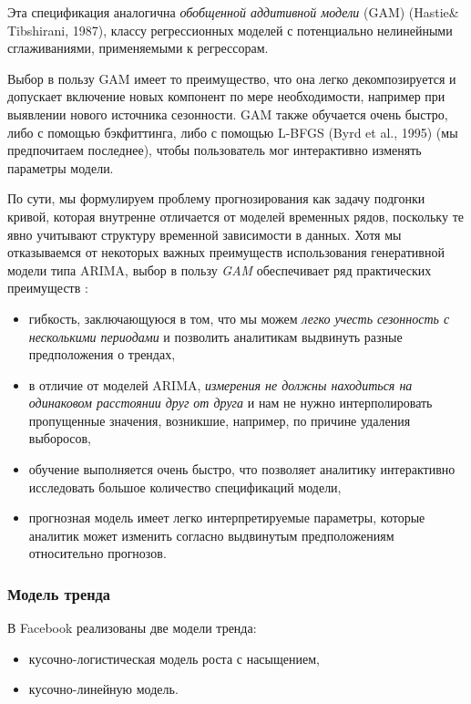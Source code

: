 \documentclass[%
	11pt,
	a4paper,
	utf8,
		]{article}
\begin{document}
Эта спецификация аналогична \emph{обобщенной аддитивной модели} (GAM) (Hastie\& Tibshirani, 1987), классу регрессионных моделей с потенциально нелинейными сглаживаниями, применяемыми к регрессорам.

Выбор в пользу GAM имеет то преимущество, что она легко декомпозируется и допускает включение новых компонент по мере необходимости, например при выявлении нового источника сезонности. GAM также обучается очень быстро, либо с помощью бэкфиттинга, либо с помощью L-BFGS (Byrd et al., 1995) (мы предпочитаем последнее), чтобы пользователь мог интерактивно изменять параметры модели.

По сути, мы формулируем проблему прогнозирования как задачу подгонки кривой, которая внутренне отличается от моделей временных рядов, поскольку те явно учитывают структуру временной зависимости в данных. Хотя мы отказываемся от некоторых важных преимуществ использования генеративной модели типа ARIMA, выбор в пользу \emph{GAM} обеспечивает ряд практических преимуществ \cite[]{gruzdev:time-series-2022}:
\begin{itemize}
	\item гибкость, заключающуюся в том, что мы можем \emph{легко учесть сезонность с несколькими периодами} и позволить аналитикам выдвинуть разные предположения о трендах,
	
	\item в отличие от моделей ARIMA, \emph{измерения не должны находиться на одинаковом расстоянии друг от друга} и нам не нужно интерполировать пропущенные значения, возникшие, например, по причине удаления выборосов,
	
	\item обучение выполняется очень быстро, что позволяет аналитику интерактивно исследовать большое количество спецификаций модели,
	
	\item прогнозная модель имеет легко интерпретируемые параметры, которые аналитик может изменить согласно выдвинутым предположениям относительно прогнозов.
\end{itemize}

\subsubsection{Модель тренда}

В Facebook реализованы две модели тренда:
\begin{itemize}
	\item кусочно-логистическая модель роста с насыщением,
	
	\item кусочно-линейную модель.
\end{itemize}
\end{document}
